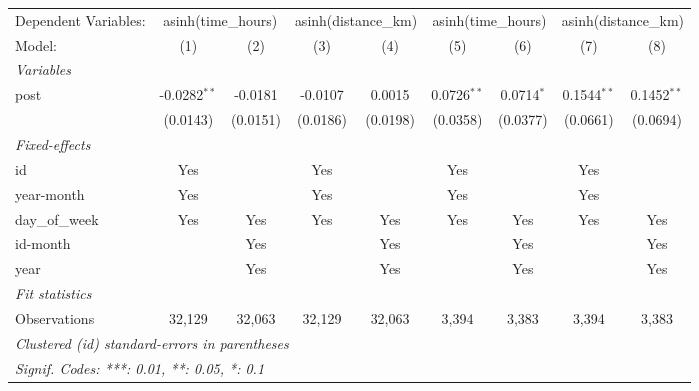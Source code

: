 
\begingroup
\centering
\begin{tabular}{lcccccccc}
   \tabularnewline \midrule \midrule
   Dependent Variables: & \multicolumn{2}{c}{asinh(time\_hours)} & \multicolumn{2}{c}{asinh(distance\_km)} & \multicolumn{2}{c}{asinh(time\_hours)} & \multicolumn{2}{c}{asinh(distance\_km)}\\
   Model:          & (1)            & (2)      & (3)      & (4)      & (5)           & (6)          & (7)           & (8)\\  
   \midrule
   \emph{Variables}\\
   post            & -0.0282$^{**}$ & -0.0181  & -0.0107  & 0.0015   & 0.0726$^{**}$ & 0.0714$^{*}$ & 0.1544$^{**}$ & 0.1452$^{**}$\\   
                   & (0.0143)       & (0.0151) & (0.0186) & (0.0198) & (0.0358)      & (0.0377)     & (0.0661)      & (0.0694)\\   
   \midrule
   \emph{Fixed-effects}\\
   id              & Yes            &          & Yes      &          & Yes           &              & Yes           & \\  
   year-month      & Yes            &          & Yes      &          & Yes           &              & Yes           & \\  
   day\_of\_week   & Yes            & Yes      & Yes      & Yes      & Yes           & Yes          & Yes           & Yes\\  
   id-month        &                & Yes      &          & Yes      &               & Yes          &               & Yes\\  
   year            &                & Yes      &          & Yes      &               & Yes          &               & Yes\\  
   \midrule
   \emph{Fit statistics}\\
   Observations    & 32,129         & 32,063   & 32,129   & 32,063   & 3,394         & 3,383        & 3,394         & 3,383\\  
   \midrule \midrule
   \multicolumn{9}{l}{\emph{Clustered (id) standard-errors in parentheses}}\\
   \multicolumn{9}{l}{\emph{Signif. Codes: ***: 0.01, **: 0.05, *: 0.1}}\\
\end{tabular}
\par\endgroup


